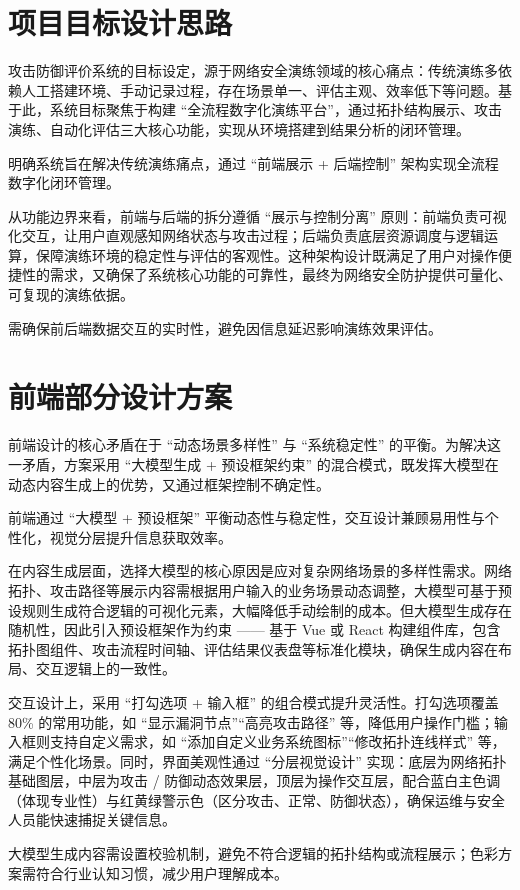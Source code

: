 \documentclass[lang=cn,10pt]{elegantbook}
\begin{document}
\section{项目目标设计思路}
攻击防御评价系统的目标设定，源于网络安全演练领域的核心痛点：传统演练多依赖人工搭建环境、手动记录过程，存在场景单一、评估主观、效率低下等问题。基于此，系统目标聚焦于构建 “全流程数字化演练平台”，通过拓扑结构展示、攻击演练、自动化评估三大核心功能，实现从环境搭建到结果分析的闭环管理。​

\begin{definition}
    明确系统旨在解决传统演练痛点，通过 “前端展示 + 后端控制” 架构实现全流程数字化闭环管理。
\end{definition}

从功能边界来看，前端与后端的拆分遵循 “展示与控制分离” 原则：前端负责可视化交互，让用户直观感知网络状态与攻击过程；后端负责底层资源调度与逻辑运算，保障演练环境的稳定性与评估的客观性。这种架构设计既满足了用户对操作便捷性的需求，又确保了系统核心功能的可靠性，最终为网络安全防护提供可量化、可复现的演练依据。

\begin{theorem}
    需确保前后端数据交互的实时性，避免因信息延迟影响演练效果评估。
\end{theorem}

\section{前端部分设计方案}
前端设计的核心矛盾在于 “动态场景多样性” 与 “系统稳定性” 的平衡。为解决这一矛盾，方案采用 “大模型生成 + 预设框架约束” 的混合模式，既发挥大模型在动态内容生成上的优势，又通过框架控制不确定性。​

\begin{definition}
    前端通过 “大模型 + 预设框架” 平衡动态性与稳定性，交互设计兼顾易用性与个性化，视觉分层提升信息获取效率。
\end{definition}
在内容生成层面，选择大模型的核心原因是应对复杂网络场景的多样性需求。网络拓扑、攻击路径等展示内容需根据用户输入的业务场景动态调整，大模型可基于预设规则生成符合逻辑的可视化元素，大幅降低手动绘制的成本。但大模型生成存在随机性，因此引入预设框架作为约束 —— 基于 Vue 或 React 构建组件库，包含拓扑图组件、攻击流程时间轴、评估结果仪表盘等标准化模块，确保生成内容在布局、交互逻辑上的一致性。​

交互设计上，采用 “打勾选项 + 输入框” 的组合模式提升灵活性。打勾选项覆盖 80\% 的常用功能，如 “显示漏洞节点”“高亮攻击路径” 等，降低用户操作门槛；输入框则支持自定义需求，如 “添加自定义业务系统图标”“修改拓扑连线样式” 等，满足个性化场景。同时，界面美观性通过 “分层视觉设计” 实现：底层为网络拓扑基础图层，中层为攻击 / 防御动态效果层，顶层为操作交互层，配合蓝白主色调（体现专业性）与红黄绿警示色（区分攻击、正常、防御状态），确保运维与安全人员能快速捕捉关键信息。
\begin{theorem}
    大模型生成内容需设置校验机制，避免不符合逻辑的拓扑结构或流程展示；色彩方案需符合行业认知习惯，减少用户理解成本。
\end{theorem}
\end{document}
